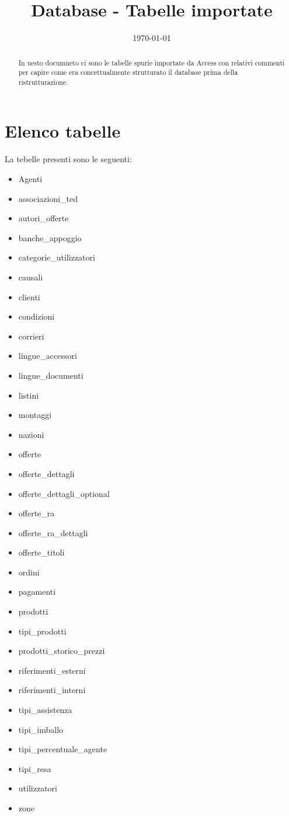 \documentclass[12pt]{article}
\title{Database - Tabelle importate}
\author{}
\date{\today}
\begin{document}
\maketitle

\begin{abstract}
    In uesto documneto ci sono le tabelle spurie importate da Access con relativi commenti per capire come era
    concettualmente strutturato il database prima della ristrutturazione.
\end{abstract}

\section{Elenco tabelle}
La tebelle presenti sono le seguenti:
\begin{itemize}
    \item Agenti
    \item associazioni\_ted
    \item autori\_offerte
    \item banche\_appoggio
    \item categorie\_utilizzatori
    \item causali
    \item clienti
    \item condizioni
    \item corrieri
    \item lingue\_accessori
    \item lingue\_documenti
    \item listini
    \item montaggi
    \item nazioni
    \item offerte
    \item offerte\_dettagli
    \item offerte\_dettagli\_optional
    \item offerte\_ra
    \item offerte\_ra\_dettagli
    \item offerte\_titoli
    \item ordini
    \item pagamenti
    \item prodotti
    \item tipi\_prodotti
    \item prodotti\_storico\_prezzi
    \item riferimenti\_esterni
    \item riferimenti\_interni
    \item tipi\_assistenza
    \item tipi\_imballo
    \item tipi\_percentuale\_agente
    \item tipi\_resa
    \item utilizzatori
    \item zone
\end{itemize}
\end{document}
